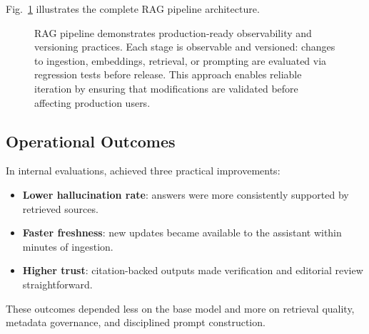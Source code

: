 Fig.~\ref{fig:ch08_ishtar_rag} illustrates the complete \ishtar{} RAG pipeline architecture.

\begin{figure}[tb]
\centering
\begin{llmfigbox}
\end{llmfigbox}
\caption{\ishtar{} RAG pipeline demonstrates production-ready observability and versioning practices. Each stage is observable and versioned: changes to ingestion, embeddings, retrieval, or prompting are evaluated via regression tests before release. This approach enables reliable iteration by ensuring that modifications are validated before affecting production users.}
\label{fig:ch08_ishtar_rag}
\end{figure}

\subsection{Operational Outcomes}
In internal evaluations, \ishtar{} achieved three practical improvements:
\begin{itemize}
    \item \textbf{Lower hallucination rate}: answers were more consistently supported by retrieved sources.
    \item \textbf{Faster freshness}: new updates became available to the assistant within minutes of ingestion.
    \item \textbf{Higher trust}: citation-backed outputs made verification and editorial review straightforward.
\end{itemize}
These outcomes depended less on the base model and more on retrieval quality, metadata governance, and disciplined prompt construction.

